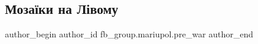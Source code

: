  
 
 
 
 

\subsection{Мозаїки на Лівому}
\label{sec:29_01_2023.fb.fb_group.mariupol.pre_war.3.moza_ki_na_l_vomu}

\ifcmt
 author_begin
   author_id fb_group.mariupol.pre_war
 author_end
\fi
